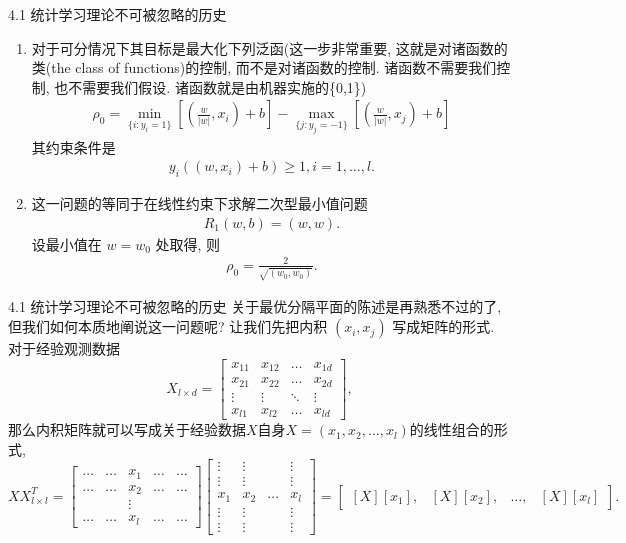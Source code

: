 \documentclass[compress,10pt,dvipsnames,notheorems]{beamer} %
\begin{document}
\begin{frame}{4.1 统计学习理论不可被忽略的历史}
\begin{enumerate}
\item 对于可分情况下其目标是最大化下列泛函(这一步非常重要, 这就是对诸函数的类(the class of functions)的控制, 而不是对诸函数的控制. 诸函数不需要我们控制, 也不需要我们假设. 诸函数就是由机器实施的\{0,1\})
\begin{align}
\label{max-functional}
\rho_0  = \min_{\{i:y_i = 1\}}[(\frac{w}{|w|},x_i)+b] - \max_{\{j:y_j = -1\}}[(\frac{w}{|w|},x_j)+b]
\end{align}
其约束条件是
\begin{align}\label{after2.3}
y_i((w,x_i)+b) \geq 1, i=1,\ldots,l.
\end{align}
\item 这一问题的等同于在线性约束下求解二次型最小值问题
\begin{align*}
R_1(w,b) = (w,w).
\end{align*}
设最小值在 $w=w_0$ 处取得, 则
\begin{align*}
\rho_0 = \frac{2}{\sqrt{(w_0,w_0)}}.
\end{align*}
\end{enumerate}
\end{frame}

\begin{frame}{4.1 统计学习理论不可被忽略的历史}
关于最优分隔平面的陈述是再熟悉不过的了, 但我们如何本质地阐说这一问题呢? 让我们先把内积 $(x_{i}, x_{j})$ 写成矩阵的形式. 对于经验观测数据
\begin{equation}
X_{l \times d} = \begin{bmatrix}
x_{11} & x_{12} & \ldots & x_{1d}\\
x_{21} & x_{22} & \ldots & x_{2d} \\
\vdots & \vdots & \ddots & \vdots \\
x_{l1} & x_{l2} & \ldots & x_{ld}
\end{bmatrix},
\end{equation}
那么内积矩阵就可以写成\textsf{关于经验数据$X$自身$X=(x_{1}, x_{2}, \ldots, x_{l})$的线性组合的形式},
\begin{equation}
XX^{T}_{l \times l} = \begin{bmatrix}
\ldots & \ldots & x_{1} & \ldots & \ldots\\
\ldots & \ldots & x_{2} & \ldots & \ldots \\
	   &        & \vdots &  &  \\
\ldots & \ldots & x_{l} & \ldots & \ldots
\end{bmatrix}
\begin{bmatrix}
\vdots & \vdots &   & \vdots\\
\vdots & \vdots &   & \vdots \\
x_{1}  & x_{2}  & \ldots  & x_{l} \\
\vdots & \vdots &   & \vdots \\
\vdots & \vdots &   & \vdots
\end{bmatrix}
= \begin{bmatrix}
[X][x_{1}], & [X][x_{2}], &  \ldots, & [X][x_{l}]
\end{bmatrix}.
\end{equation}
\end{frame}
\end{document}
